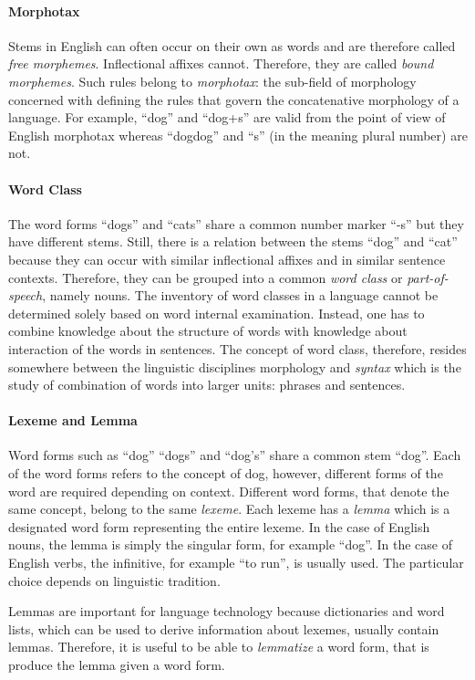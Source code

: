 \paragraph{Morphotax} Stems in English can often occur on their own as
words and are therefore called {\it free morphemes}. Inflectional
affixes cannot. Therefore, they are called {\it bound morphemes}. Such
rules belong to {\it morphotax}: the sub-field of morphology
concerned with defining the rules that govern the concatenative
morphology of a language. For example, ``dog'' and ``dog+s'' are valid
from the point of view of English morphotax whereas ``dogdog'' and
``s'' (in the meaning plural number) are not.

\paragraph{Word Class} The word forms ``dogs'' and ``cats'' share a
common number marker ``-s'' but they have different stems. Still, there
is a relation between the stems ``dog'' and ``cat'' because they can
occur with similar inflectional affixes and in similar sentence
contexts. Therefore, they can be grouped into a common {\it word
  class} or {\it part-of-speech}, namely nouns.  The inventory of word
classes in a language cannot be determined solely based on word
internal examination. Instead, one has to combine knowledge about the
structure of words with knowledge about interaction of the words in
sentences. The concept of word class, therefore, resides somewhere
between the linguistic disciplines morphology and {\it syntax} which
is the study of combination of words into larger units: phrases and
sentences.

\paragraph{Lexeme and Lemma} Word forms such as ``dog'' ``dogs'' and
``dog's'' share a common stem ``dog''. Each of the word forms refers
to the concept of {\sc dog}, however, different forms of the word are
required depending on context. Different word forms, that denote the
same concept, belong to the same {\it lexeme}. Each lexeme has a {\it
  lemma} which is a designated word form representing the entire
lexeme. In the case of English nouns, the lemma is simply the singular
form, for example ``dog''. In the case of English verbs, the
infinitive, for example ``to run'', is usually used. The particular
choice depends on linguistic tradition. 

Lemmas are important for language technology because dictionaries and
word lists, which can be used to derive information about lexemes,
usually contain lemmas. Therefore, it is useful to be able to {\it
  lemmatize} a word form, that is produce the lemma given a word form.

